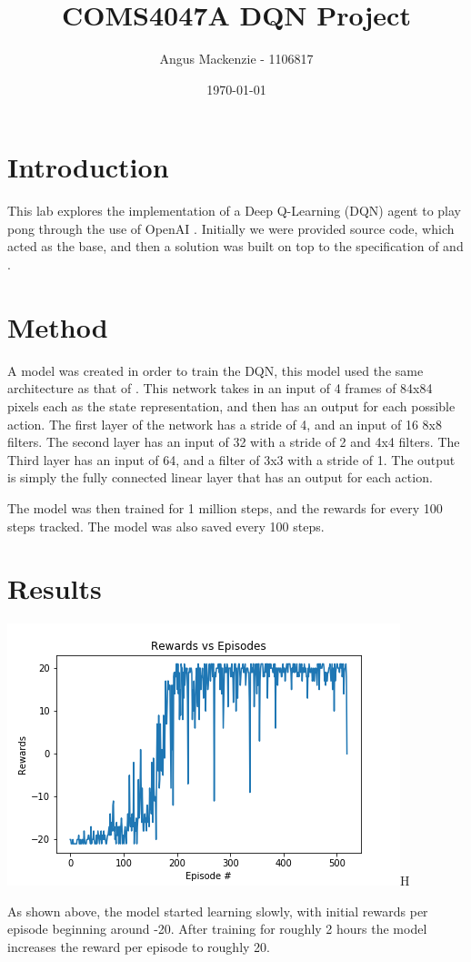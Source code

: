 \documentclass[10pt]{article}
\begin{document}
\title{COMS4047A DQN Project}
\author{Angus Mackenzie - 1106817}
\date{\today} 
\maketitle 
\pagestyle{fancy}
\fancyhf{}
\fancyhead[R]{\thepage}
{}
\section{Introduction}
This lab explores the implementation of a Deep Q-Learning (DQN) agent to play pong through the use of OpenAI \cite{openai}. Initially we were provided source code, which acted as the base, and then a solution was built on top to the specification of \cite{Deepmind} and \cite{NaturePaper}.

\section{Method}
A model was created in order to train the DQN, this model used the same architecture as that of \cite{NaturePaper}. This network takes in an input of 4 frames of 84x84 pixels each as the state representation, and then has an output for each possible action. The first layer of the network has a stride of 4, and an input of 16 8x8 filters. The second layer has an input of 32 with a stride of 2 and 4x4 filters. The Third layer has an input of 64, and a filter of 3x3 with a stride of 1. The output is simply the fully connected linear layer that has an output for each action. 

The model was then trained for 1 million steps, and the rewards for every 100 steps tracked. The model was also saved every 100 steps. 

\section{Results}

\includegraphics{../submission/plot.png}H

As shown above, the model started learning slowly, with initial rewards per episode beginning around -20. After training for roughly 2 hours the model increases the reward per episode to roughly 20.




\end{document}
